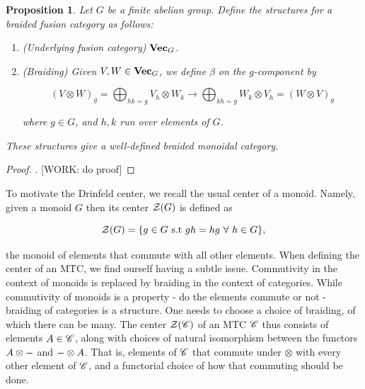 \documentclass{article}
\newtheorem{proposition}{Proposition}[section]
\theoremstyle{definition}
\numberwithin{figure}{section}
\begin{document}
\begin{proposition} Let $G$ be a finite abelian group. Define the structures for a braided fusion category as follows:

\begin{enumerate}
\item (Underlying fusion category) $\bold{Vec}_G$.
\item (Braiding) Given $V,W\in \bold{Vec}_G$, we define $\beta$ on the $g$-component by

$$\left(V\otimes W\right)_g = \bigoplus_{hk=g}V_h\otimes W_k \xrightarrow{} \bigoplus_{kh=g}W_k\otimes V_h=\left(W\otimes V\right)_g$$

where $g\in G$, and $h,k$ run over elements of $G$.
\end{enumerate}

These structures give a well-defined braided monoidal category.
\end{proposition}
\begin{proof}. [WORK: do proof]
\end{proof}


To motivate the Drinfeld center, we recall the usual center of a monoid. Namely, given a monoid $G$ then its center $\mathcal{Z}(G)$ is defined as

$$\mathcal{Z}(G)=\{g\in G \,\,\mathrm{s.t}\,\, gh=hg\,\,\forall\,\, h\in G\},$$

the monoid of elements that commute with all other elements. When defining the center of an MTC, we find ourself having a subtle issue. Commutivity in the context of monoids is replaced by braiding in the context of categories. While commutivity of monoids is a property - do the elements commute or not - braiding of categories is a structure. One needs to choose a choice of braiding, of which there can be many. The center $\mathcal{Z}(\mathscr{C})$ of an MTC $\mathscr{C}$ thus consists of elements $A\in \mathscr{C}$, along with choices of natural isomorphism between the functors $A\otimes \--$ and $\-- \otimes A$. That is, elements of $\mathscr{C}$ that commute under $\otimes$ with every other element of $\mathscr{C}$, and a functorial choice of how that commuting should be done.
\end{document}
